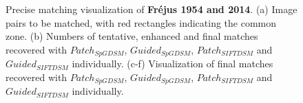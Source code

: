 \begin{figure}[htbp]
\begin{center}
{\begin{minipage}[t]{0.48\linewidth}
			\end{minipage}%
		}
		\caption{Precise matching visualization of \textbf{Fr{\'e}jus 1954 and 2014}. (a) Image pairs to be matched, with red rectangles indicating the common zone. (b) Numbers of tentative, enhanced and final matches recovered with $Patch_{SpGDSM}$, $Guided_{SpGDSM}$, $Patch_{SIFTDSM}$ and $Guided_{SIFTDSM}$ individually. (c-f) Visualization of final matches recovered with $Patch_{SpGDSM}$, $Guided_{SpGDSM}$, $Patch_{SIFTDSM}$ and $Guided_{SIFTDSM}$ individually.}
		\label{MatchVizFrejus1954-2014}
	\end{center}
\end{figure} 


